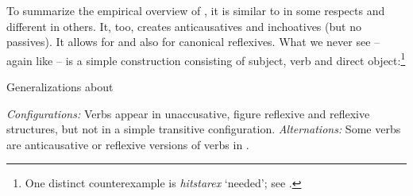 \begin{exe}
\begin{xlist}
\begin{xlist}
\begin{exe}
\begin{xlist}
\begin{xlist}
\begin{exe}
\begin{xlist}
\begin{xlist}
\begin{exe}
\begin{exe}
\begin{xlist}
\begin{exe}
\begin{exe}
\begin{xlist}
\begin{exe}
\begin{exe}
\begin{exe}
\begin{exe}
\begin{exe}
\begin{xlist}
\begin{exe}
\begin{xlist}
\begin{exe}
\begin{exe}
\begin{xlist}
\begin{exe}
\begin{xlist}
\begin{exe}
\begin{xlist}
\begin{exe}
\begin{exe}
\begin{exe}
\begin{xlist}
\begin{exe}
\begin{exe}
\begin{exe}
\begin{xlist}
\begin{exe}
\begin{xlist}
\begin{exe}
\begin{exe}
\begin{xlist}
\begin{exe}
\begin{exe}
\begin{exe}
\begin{exe}
\begin{xlist}
\begin{exe}
\begin{xlist}
\begin{exe}
\begin{xlist}
\begin{exe}
\begin{xlist}
\begin{exe}
\begin{xlist}
\begin{exe}
\begin{xlist}
\begin{exe}
\begin{exe}
\begin{xlist}
\begin{exe}
\begin{xlist}
\begin{exe}
\begin{exe}
\begin{xlist}
\begin{exe}
\begin{xlist}
\begin{exe}
\begin{exe}
\begin{exe}
\begin{exe}
\begin{xlist}
\begin{xlist}
\begin{exe}
\begin{xlist}
\begin{exe}
\begin{exe}
\begin{exe}
\begin{xlist}
\begin{exe}
\begin{exe}
\begin{xlist}
\begin{exe}
\begin{exe}
\begin{exe}
\begin{xlist}
\begin{xlist}
\begin{exe}
\begin{xlist}
\begin{exe}
\begin{exe}
\begin{exe}
To summarize the empirical overview of {\thit}, it is similar to {\tnif} in some respects and different in others. It, too, creates anticausatives and inchoatives (but no passives). It allows for  and also for canonical reflexives. What we never see -- again like {\tnif} -- is a simple  construction consisting of subject, verb and direct object:\footnote{One distinct counterexample is \emph{hitstarex} `needed'; see \citet[130ff16]{harveskayne12}.}\pagebreak

 \begin{exe}
 \ex  \label{ex:gen-thit}Generalizations about {\thit}
 \begin{xlist} 
 	\ex  \textit{Configurations:} Verbs appear in unaccusative, figure reflexive and reflexive structures, but not in a simple transitive configuration. 
 	\ex \sloppy \textit{Alternations:} Some verbs are anticausative or reflexive versions of verbs in {\tpie}. 
 \z
\z 


\end{xlist}
\end{exe}
\end{exe}
\end{exe}
\end{exe}
\end{xlist}
\end{exe}
\end{xlist}
\end{xlist}
\end{exe}
\end{exe}
\end{exe}
\end{xlist}
\end{exe}
\end{exe}
\end{xlist}
\end{exe}
\end{exe}
\end{exe}
\end{xlist}
\end{exe}
\end{xlist}
\end{xlist}
\end{exe}
\end{exe}
\end{exe}
\end{exe}
\end{xlist}
\end{exe}
\end{xlist}
\end{exe}
\end{exe}
\end{xlist}
\end{exe}
\end{xlist}
\end{exe}
\end{exe}
\end{xlist}
\end{exe}
\end{xlist}
\end{exe}
\end{xlist}
\end{exe}
\end{xlist}
\end{exe}
\end{xlist}
\end{exe}
\end{xlist}
\end{exe}
\end{exe}
\end{exe}
\end{exe}
\end{xlist}
\end{exe}
\end{exe}
\end{xlist}
\end{exe}
\end{xlist}
\end{exe}
\end{exe}
\end{exe}
\end{xlist}
\end{exe}
\end{exe}
\end{exe}
\end{xlist}
\end{exe}
\end{xlist}
\end{exe}
\end{xlist}
\end{exe}
\end{exe}
\end{xlist}
\end{exe}
\end{xlist}
\end{exe}
\end{exe}
\end{exe}
\end{exe}
\end{exe}
\end{xlist}
\end{exe}
\end{exe}
\end{xlist}
\end{exe}
\end{exe}
\end{xlist}
\end{xlist}
\end{exe}
\end{xlist}
\end{xlist}
\end{exe}
\end{xlist}
\end{xlist}
\end{exe}
